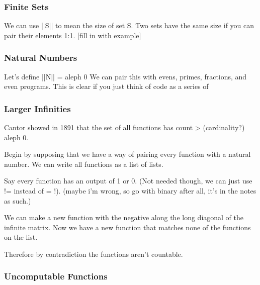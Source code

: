 \subsubsection{Finite Sets}
We can use ||S|| to mean the size of set S.
Two sets have the same size if you can pair their elements 1:1.
[fill in with example]

\subsubsection{Natural Numbers}
Let's define ||N|| = aleph 0
We can pair this with evens, primes, fractions, and even programs.
This is clear if you just think of code as a series of 

\subsubsection{Larger Infinities}
Cantor showed in 1891 that the set of all functions has count > (cardinality?) aleph 0.

Begin by supposing that we have a way of pairing every function with a natural number.
We can write all functions as a list of lists.

Say every function has an output of 1 or 0. (Not needed though, we can just use != instead of = !). (maybe i'm wrong, so go with binary after all, it's in the notes as such.)

We can make a new function with the negative along the long diagonal of the infinite matrix.
Now we have a new function that matches none of the functions on the list.

Therefore by contradiction the functions aren't countable.

\subsubsection{Uncomputable Functions}
